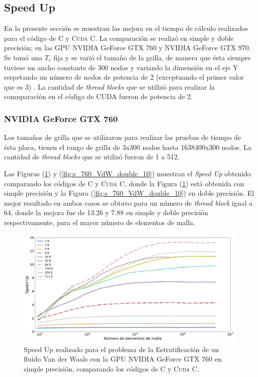 \newpage

\subsection{Speed Up}

En la presente sección se muestran las mejora en el tiempo de cálculo realizados para el código de \textsc{C} y \textsc{Cuda C}. La comparación se realizó en simple y doble precisión; en las GPU NVIDIA GeForce GTX 760 y NVIDIA GeForce GTX 970. Se tomó una $T_r$ fija y se varió el tamaño de la grilla, de manera que ésta siempre tuviese un ancho constante de 300 nodos y variando la dimensión en el eje \textsc{Y} respetando un número de nodos de potencia de 2 (exceptuando el primer valor que es 3) . La cantidad de \textit{thread blocks} que se utilizó para realizar la comnparación en el código de \textsc{CUDA} fueron de potencia de 2.

\subsubsection{NVIDIA GeForce GTX 760}

Los tamaños de grilla que se utilizaron para realizar las pruebas de tiempo de ésta placa, tienen el rango de grilla de 3x300 nodos hasta 1638400x300 nodos. La cantidad de \textit{thread blocks} que se utilizó fueron de 1 a 512.

Las Figuras (\ref{fig:s_760_VdW_simple_10}) y (\ref{fig:s_760_VdW_double_10}) muestran el \textit{Speed Up} obtenido comparando los códigos de \textsc{C} y \textsc{Cuda C}, donde la Figura (\ref{fig:s_760_VdW_simple_10}) está obtenida con simple precisión y la Figura (\ref{fig:s_760_VdW_double_10}) en doble precisión. El mejor resultado en ambos casos se obtuvo para un número de \textit{thread block} igual a 64, donde la mejora fue de 13.26 y 7.88 en simple y doble precisión respectivamente, para el mayor número de elementos de malla.


\begin{figure}[htbp]
	\centering
	\includegraphics[width=\textwidth]{figs/cap4/s_760_VdW_simple_10}
	\caption{Speed Up realizado para el problema de la Estratificación de un fluido Van der Waals con la GPU NVIDIA GeForce GTX 760 en simple precisión, comparando los códigos de \textsc{C} y \textsc{Cuda C}.} 
	\label{fig:s_760_VdW_simple_10}	
\end{figure}

